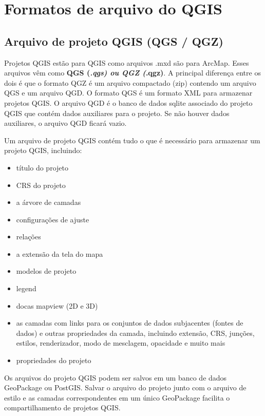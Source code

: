 \documentclass[
]{krantz}
\providecommand{\tightlist}{%
  \setlength{\itemsep}{0pt}\setlength{\parskip}{0pt}}
\begin{document}
\hypertarget{formatos-de-arquivo-do-qgis}{%
\section{Formatos de arquivo do QGIS}\label{formatos-de-arquivo-do-qgis}}

\hypertarget{arquivo-de-projeto-qgis-qgs-qgz}{%
\subsection{Arquivo de projeto QGIS (QGS / QGZ)}\label{arquivo-de-projeto-qgis-qgs-qgz}}

Projetos QGIS estão para QGIS como arquivos .mxd são para ArcMap. Esses arquivos vêm como \textbf{QGS (\emph{.qgs)\textbf{ ou }QGZ (}.qgz)}. A principal diferença entre os dois é que o formato QGZ é um arquivo compactado (zip) contendo um arquivo QGS e um arquivo QGD. O formato QGS é um formato XML para armazenar projetos QGIS. O arquivo QGD é o banco de dados sqlite associado do projeto QGIS que contém dados auxiliares para o projeto. Se não houver dados auxiliares, o arquivo QGD ficará vazio.

Um arquivo de projeto QGIS contém tudo o que é necessário para armazenar um projeto QGIS, incluindo:

\begin{itemize}
\tightlist
\item
  título do projeto
\item
  CRS do projeto
\item
  a árvore de camadas
\item
  configurações de ajuste
\item
  relações
\item
  a extensão da tela do mapa
\item
  modelos de projeto
\item
  legend
\item
  docas mapview (2D e 3D)
\item
  as camadas com links para os conjuntos de dados subjacentes (fontes de dados) e outras propriedades da camada, incluindo extensão, CRS, junções, estilos, renderizador, modo de mesclagem, opacidade e muito mais
\item
  propriedades do projeto
\end{itemize}

Os arquivos do projeto QGIS podem ser salvos em um banco de dados GeoPackage ou PostGIS. Salvar o arquivo do projeto junto com o arquivo de estilo e as camadas correspondentes em um único GeoPackage facilita o compartilhamento de projetos QGIS.
\end{document}

